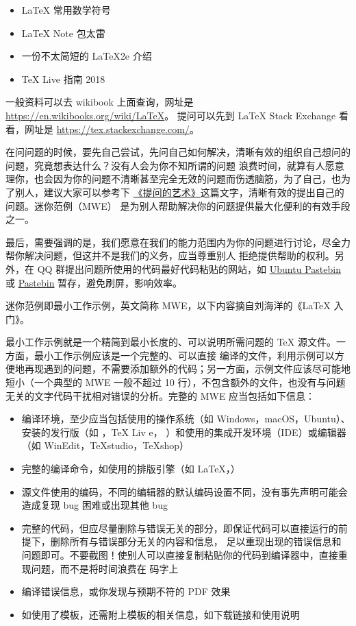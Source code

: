
\begin{itemize}
\item \LaTeX{} 常用数学符号
\item \LaTeX{} Note 包太雷
\item 一份不太简短的 \LaTeX{2e} 介绍
\item \TeX{} Live 指南 2018
\end{itemize}



一般资料可以去 wikibook 上面查询，网址是
\url{https://en.wikibooks.org/wiki/LaTeX}。
提问可以先到 \LaTeX{} Stack Exchange 看看，网址是
\url{https://tex.stackexchange.com/}。



在问问题的时候，要先自己尝试，先问自己如何解决，清晰有效的组织自己想问的问题，究竟想表达什么？没有人会为你不知所谓的问题
浪费时间，就算有人愿意理你，也会因为你的问题不清晰甚至完全无效的问题而伤透脑筋，为了自己，也为了别人，建议大家可以参考下
\href{https://www.jianshu.com/p/f96aa7f7bf59}{《提问的艺术》}这篇文字，清晰有效的提出自己的问题。迷你范例（MWE）
是为别人帮助解决你的问题提供最大化便利的有效手段之一。

最后，需要强调的是，我们愿意在我们的能力范围内为你的问题进行讨论，尽全力帮你解决问题，但这并不是我们的义务，应当尊重别人
拒绝提供帮助的权利。另外，在 QQ 群提出问题所使用的代码最好代码粘贴的网站，如
\href{https://paste.ubuntu.com/}{Ubuntu Pastebin}
或
\href{https://pastebin.com/}{Pastebin}
暂存，避免刷屏，影响效率。


迷你范例即最小工作示例，英文简称 MWE，以下内容摘自刘海洋的《\LaTeX{} 入门》。

最小工作示例就是一个精简到最小长度的、可以说明所需问题的 \TeX{} 源文件。一方面，最小工作示例应该是一个完整的、可以直接
编译的文件，利用示例可以方便地再现遇到的问题，不需要添加额外的代码；另一方面，示例文件应该尽可能地短小（一个典型的 MWE
一般不超过 10 行），不包含额外的文件，也没有与问题无关的文字代码干扰相对错误的分析。完整的 MWE 应当包括如下信息：
\begin{itemize}
\item 编译环境，至少应当包括使用的操作系统（如 Windows，macOS，Ubuntu）、安装的发行版（如 \CTeX{}，\TeX{} Liv
  e，\MacTeX{} ）和使用的集成开发环境（IDE）或编辑器（如 WinEdit，TeXstudio，TeXshop）
\item 完整的编译命令，如使用的排版引擎（如 \LaTeX{}，\XeLaTeX{}）
\item 源文件使用的编码，不同的编辑器的默认编码设置不同，没有事先声明可能会造成复现 bug 困难或出现其他 bug
\item 完整的代码，但应尽量删除与错误无关的部分，即保证代码可以直接运行的前提下，删除所有与错误部分无关的内容和信息，
  足以重现出现的错误信息和问题即可。不要截图！使别人可以直接复制粘贴你的代码到编译器中，直接重现问题，而不是将时间浪费在
  码字上
\item 编译错误信息，或你发现与预期不符的 PDF 效果
\item 如使用了模板，还需附上模板的相关信息，如下载链接和使用说明
\end{itemize}



